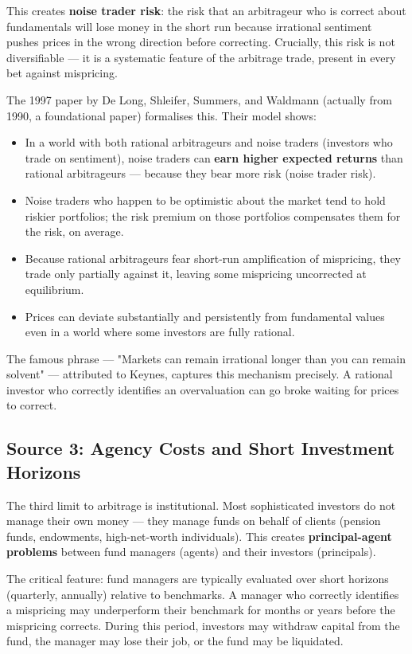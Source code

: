 \documentclass[12pt, letterpaper]{article}
\begin{document}
This creates \textbf{noise trader risk}: the risk that an arbitrageur who is correct about fundamentals will lose money in the short run because irrational sentiment pushes prices in the wrong direction before correcting. Crucially, this risk is not diversifiable --- it is a systematic feature of the arbitrage trade, present in every bet against mispricing.

The 1997 paper by De Long, Shleifer, Summers, and Waldmann (actually from 1990, a foundational paper) formalises this. Their model shows:

\begin{itemize}
\item In a world with both rational arbitrageurs and noise traders (investors who trade on sentiment), noise traders can \textbf{earn higher expected returns} than rational arbitrageurs --- because they bear more risk (noise trader risk).
\item Noise traders who happen to be optimistic about the market tend to hold riskier portfolios; the risk premium on those portfolios compensates them for the risk, on average.
\item Because rational arbitrageurs fear short-run amplification of mispricing, they trade only partially against it, leaving some mispricing uncorrected at equilibrium.
\item Prices can deviate substantially and persistently from fundamental values even in a world where some investors are fully rational.
\end{itemize}

The famous phrase --- "Markets can remain irrational longer than you can remain solvent" --- attributed to Keynes, captures this mechanism precisely. A rational investor who correctly identifies an overvaluation can go broke waiting for prices to correct.


\subsection{Source 3: Agency Costs and Short Investment Horizons}


The third limit to arbitrage is institutional. Most sophisticated investors do not manage their own money --- they manage funds on behalf of clients (pension funds, endowments, high-net-worth individuals). This creates \textbf{principal-agent problems} between fund managers (agents) and their investors (principals).

The critical feature: fund managers are typically evaluated over short horizons (quarterly, annually) relative to benchmarks. A manager who correctly identifies a mispricing may underperform their benchmark for months or years before the mispricing corrects. During this period, investors may withdraw capital from the fund, the manager may lose their job, or the fund may be liquidated.
\end{document}
